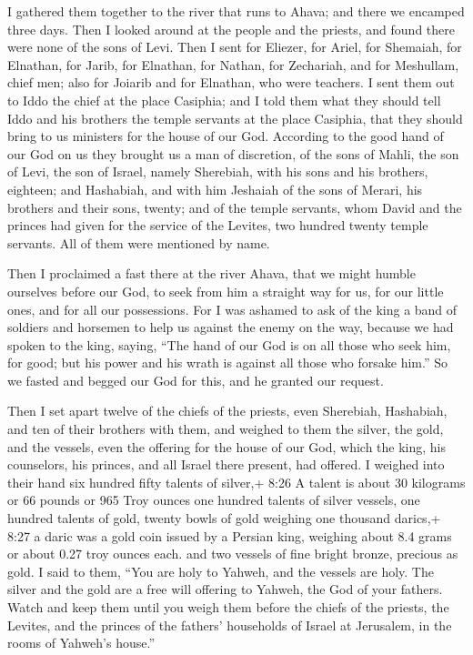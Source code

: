  I gathered them together to the river that runs to Ahava;
and there we encamped three days. Then I looked around at the people and
the priests, and found there were none of the sons of Levi.
 Then I sent for Eliezer, for Ariel, for Shemaiah, for
Elnathan, for Jarib, for Elnathan, for Nathan, for Zechariah, and for
Meshullam, chief men; also for Joiarib and for Elnathan, who were
teachers.  I sent them out to Iddo the chief at the place
Casiphia; and I told them what they should tell Iddo and his brothers
the temple servants at the place Casiphia, that they should bring to us
ministers for the house of our God.  According to the good
hand of our God on us they brought us a man of discretion, of the sons
of Mahli, the son of Levi, the son of Israel, namely Sherebiah, with his
sons and his brothers, eighteen;  and Hashabiah, and with
him Jeshaiah of the sons of Merari, his brothers and their sons, twenty;
 and of the temple servants, whom David and the princes had
given for the service of the Levites, two hundred twenty temple
servants. All of them were mentioned by name.

 Then I proclaimed a fast there at the river Ahava, that we
might humble ourselves before our God, to seek from him a straight way
for us, for our little ones, and for all our possessions. 
For I was ashamed to ask of the king a band of soldiers and horsemen to
help us against the enemy on the way, because we had spoken to the king,
saying, ``The hand of our God is on all those who seek him, for good;
but his power and his wrath is against all those who forsake him.''
 So we fasted and begged our God for this, and he granted
our request.

 Then I set apart twelve of the chiefs of the priests, even
Sherebiah, Hashabiah, and ten of their brothers with them, 
and weighed to them the silver, the gold, and the vessels, even the
offering for the house of our God, which the king, his counselors, his
princes, and all Israel there present, had offered.  I
weighed into their hand six hundred fifty talents of silver,+ 8:26 A
talent is about 30 kilograms or 66 pounds or 965 Troy ounces one hundred
talents of silver vessels, one hundred talents of gold, 
twenty bowls of gold weighing one thousand darics,+ 8:27 a daric was a
gold coin issued by a Persian king, weighing about 8.4 grams or about
0.27 troy ounces each. and two vessels of fine bright bronze, precious
as gold.  I said to them, ``You are holy to Yahweh, and the
vessels are holy. The silver and the gold are a free will offering to
Yahweh, the God of your fathers.  Watch and keep them until
you weigh them before the chiefs of the priests, the Levites, and the
princes of the fathers' households of Israel at Jerusalem, in the rooms
of Yahweh's house.''

